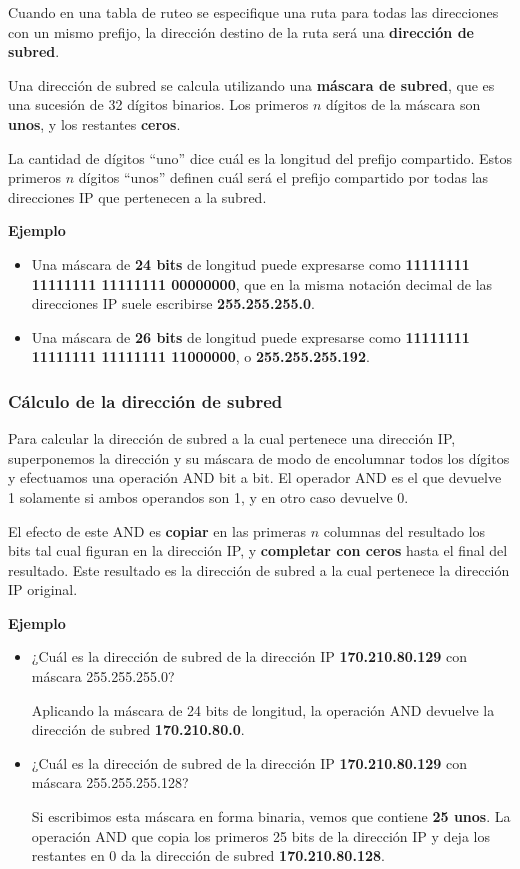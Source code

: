 \documentclass[spanish,a4paper,]{article}
\providecommand{\tightlist}{%
  \setlength{\itemsep}{0pt}\setlength{\parskip}{0pt}}
\begin{document}
Cuando en una tabla de ruteo se especifique una ruta para todas las
direcciones con un mismo prefijo, la dirección destino de la ruta será
una \textbf{dirección de subred}.

Una dirección de subred se calcula utilizando una \textbf{máscara de
subred}, que es una sucesión de 32 dígitos binarios. Los primeros \(n\)
dígitos de la máscara son \textbf{unos}, y los restantes \textbf{ceros}.

La cantidad de dígitos ``uno'' dice cuál es la longitud del prefijo
compartido. Estos primeros \(n\) dígitos ``unos'' definen cuál será el
prefijo compartido por todas las direcciones IP que pertenecen a la
subred.

\textbf{Ejemplo}

\begin{itemize}
\tightlist
\item
  Una máscara de \textbf{24 bits} de longitud puede expresarse como
  \textbf{11111111 11111111 11111111 00000000}, que en la misma notación
  decimal de las direcciones IP suele escribirse \textbf{255.255.255.0}.
\item
  Una máscara de \textbf{26 bits} de longitud puede expresarse como
  \textbf{11111111 11111111 11111111 11000000}, o
  \textbf{255.255.255.192}.
\end{itemize}

\hypertarget{cuxe1lculo-de-la-direcciuxf3n-de-subred}{%
\subsubsection{Cálculo de la dirección de
subred}\label{cuxe1lculo-de-la-direcciuxf3n-de-subred}}

Para calcular la dirección de subred a la cual pertenece una dirección
IP, superponemos la dirección y su máscara de modo de encolumnar todos
los dígitos y efectuamos una operación AND bit a bit. El operador AND es
el que devuelve 1 solamente si ambos operandos son 1, y en otro caso
devuelve 0.

El efecto de este AND es \textbf{copiar} en las primeras \(n\) columnas
del resultado los bits tal cual figuran en la dirección IP, y
\textbf{completar con ceros} hasta el final del resultado. Este
resultado es la dirección de subred a la cual pertenece la dirección IP
original.

\textbf{Ejemplo}

\begin{itemize}
\item
  ¿Cuál es la dirección de subred de la dirección IP
  \textbf{170.210.80.129} con máscara 255.255.255.0?

  Aplicando la máscara de 24 bits de longitud, la operación AND devuelve
  la dirección de subred \textbf{170.210.80.0}.
\item
  ¿Cuál es la dirección de subred de la dirección IP
  \textbf{170.210.80.129} con máscara 255.255.255.128?

  Si escribimos esta máscara en forma binaria, vemos que contiene
  \textbf{25 unos}. La operación AND que copia los primeros 25 bits de
  la dirección IP y deja los restantes en 0 da la dirección de subred
  \textbf{170.210.80.128}.
\end{itemize}
\end{document}
